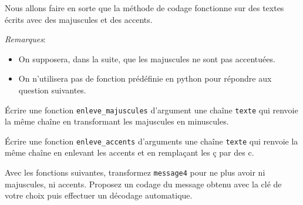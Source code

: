 Nous allons faire en sorte que la méthode de codage fonctionne sur des textes écrits avec des majuscules et des accents.
\smallskip

\emph{Remarques}: 
\begin{itemize}
\item[\textbullet] On supposera, dans la suite, que les majuscules ne sont pas accentuées.
\item[\textbullet] On n'utilisera pas de fonction prédéfinie en python pour répondre aux question suivantes.
\end{itemize}
\smallskip

\begin{question}
\'Ecrire une fonction \texttt{enleve\_majuscules} d'argument une chaîne \texttt{texte} qui renvoie la même chaîne en transformant les majuscules en minuscules.
\end{question}

\begin{question}
\'Ecrire une fonction \texttt{enleve\_accents} d'arguments une chaîne \texttt{texte}  qui renvoie la même chaîne en enlevant les accents et en remplaçant les ç par des c.
\end{question}

\begin{question}
Avec les fonctions suivantes, transformez \texttt{message4} pour ne plus avoir ni majuscules, ni accents. Proposez un codage du message obtenu avec la clé de votre choix puis effectuer un décodage automatique.
\end{question}

